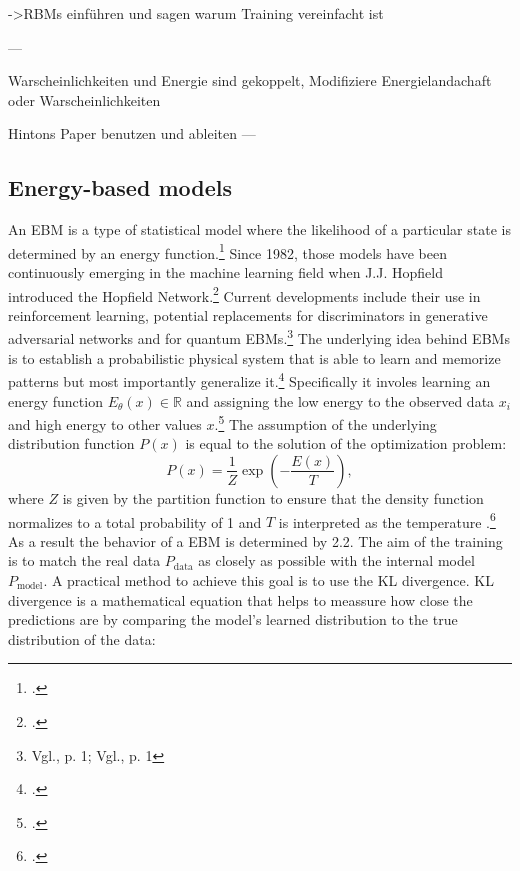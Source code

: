 ->RBMs einführen und sagen warum Training vereinfacht ist

---

Warscheinlichkeiten und Energie sind gekoppelt, Modifiziere Energielandachaft oder Warscheinlichkeiten

Hintons Paper benutzen und ableiten
---

\subsection{Energy-based models}


An \ac{EBM} is a type of statistical model where the likelihood of a particular state is determined by an energy function.\footcite[Vgl.][2]{huembeliPhysicsEnergybasedModels2022}
Since 1982, those models have been continuously emerging in the machine learning field when J.J. Hopfield introduced the Hopfield Network.\footcite[Vgl.][]{hopfieldNeuralNetworksPhysical1982}
Current developments include their use in reinforcement learning, potential replacements for discriminators in generative adversarial networks and for quantum \ac{EBM}s.\footnote{Vgl.\cite{verdonQuantumHamiltonianBasedModels2019}, p. 1; Vgl.\cite{duModelBasedPlanning2021}, p. 1}
The underlying idea behind \ac{EBM}s is to establish a probabilistic physical system that is able to learn and memorize patterns but most importantly generalize it.\footcite[Vgl.][2]{huembeliPhysicsEnergybasedModels2022} 
Specifically it involes learning an energy function \(E_{\theta}(x) \in \mathbb{R}\) and assigning the low energy to the observed data \(x_i\) and high energy to other values \(x\).\footcite[Vgl.][330]{gustafssonEnergyBasedModelsDeep2020}
The assumption of the underlying distribution function \( P(x) \)  is equal to the solution of the optimization problem:
\begin{equation}
    P(x) = \frac{1}{Z} \exp\left(-\frac{E(x)}{T}\right),
\end{equation}
where \( Z \) is given by the partition function to ensure
that the density function normalizes to a total probability of 1 and \( T \) is interpreted as the temperature .\footcite[Vgl.][2-3]{huembeliPhysicsEnergybasedModels2022}
As a result the behavior of a \ac{EBM} is determined by 2.2. 
The aim of the training is to match the real data \( P_{\text{data}} \) as closely as possible with the internal model \( P_{\text{model}} \).
A practical method to achieve this goal is to use the KL divergence. KL divergence is a mathematical equation that helps to meassure how close the predictions are by comparing the model's learned distribution to the true distribution of the data:
